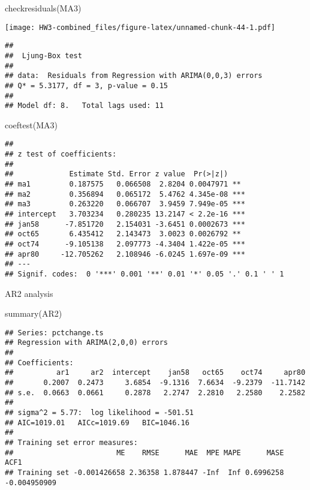 \documentclass[
]{article}
\newenvironment{Shaded}{\begin{snugshade}}{\end{snugshade}}
\newcommand{\FunctionTok}[1]{\textcolor[rgb]{0.00,0.00,0.00}{#1}}
\newcommand{\NormalTok}[1]{#1}
\begin{document}
\begin{Shaded}
\begin{Highlighting}[]
\FunctionTok{checkresiduals}\NormalTok{(MA3)}
\end{Highlighting}
\end{Shaded}

\texttt{[image: HW3-combined\_files/figure-latex/unnamed-chunk-44-1.pdf]}

\begin{verbatim}
## 
##  Ljung-Box test
## 
## data:  Residuals from Regression with ARIMA(0,0,3) errors
## Q* = 5.3177, df = 3, p-value = 0.15
## 
## Model df: 8.   Total lags used: 11
\end{verbatim}

\begin{Shaded}
\begin{Highlighting}[]
\FunctionTok{coeftest}\NormalTok{(MA3)}
\end{Highlighting}
\end{Shaded}

\begin{verbatim}
## 
## z test of coefficients:
## 
##             Estimate Std. Error z value  Pr(>|z|)    
## ma1         0.187575   0.066508  2.8204 0.0047971 ** 
## ma2         0.356894   0.065172  5.4762 4.345e-08 ***
## ma3         0.263220   0.066707  3.9459 7.949e-05 ***
## intercept   3.703234   0.280235 13.2147 < 2.2e-16 ***
## jan58      -7.851720   2.154031 -3.6451 0.0002673 ***
## oct65       6.435412   2.143473  3.0023 0.0026792 ** 
## oct74      -9.105138   2.097773 -4.3404 1.422e-05 ***
## apr80     -12.705262   2.108946 -6.0245 1.697e-09 ***
## ---
## Signif. codes:  0 '***' 0.001 '**' 0.01 '*' 0.05 '.' 0.1 ' ' 1
\end{verbatim}

AR2 analysis

\begin{Shaded}
\begin{Highlighting}[]
\FunctionTok{summary}\NormalTok{(AR2)}
\end{Highlighting}
\end{Shaded}

\begin{verbatim}
## Series: pctchange.ts 
## Regression with ARIMA(2,0,0) errors 
## 
## Coefficients:
##          ar1     ar2  intercept    jan58   oct65    oct74     apr80
##       0.2007  0.2473     3.6854  -9.1316  7.6634  -9.2379  -11.7142
## s.e.  0.0663  0.0661     0.2878   2.2747  2.2810   2.2580    2.2582
## 
## sigma^2 = 5.77:  log likelihood = -501.51
## AIC=1019.01   AICc=1019.69   BIC=1046.16
## 
## Training set error measures:
##                        ME    RMSE      MAE  MPE MAPE      MASE         ACF1
## Training set -0.001426658 2.36358 1.878447 -Inf  Inf 0.6996258 -0.004950909
\end{verbatim}
\end{document}

